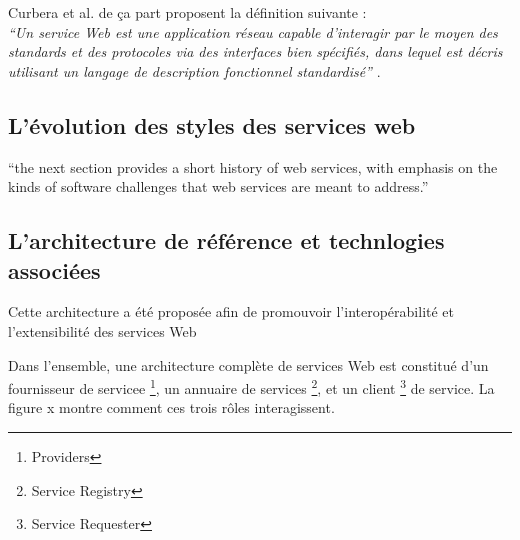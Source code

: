	 


	Curbera et al. \cite{curbera2001web} de ça part proposent la définition suivante :\\

	\emph{``Un service Web est une application réseau capable d'interagir par le moyen des standards et des protocoles 
	via des interfaces bien spécifiés, dans lequel est décris utilisant un langage de description fonctionnel
	standardisé''} .\\


    \subsection{L'évolution des styles des services web}
	``the next section provides a short history of web services, with emphasis on the kinds of software challenges
	that web services are meant to address.''

    \subsection{L'architecture de référence et technlogies associées}
	\cite{curbera2002unraveling} \cite{gottschalk2002introduction} \cite{kreger2001web} \cite{WSA}
	Cette architecture a été proposée afin de promouvoir l’interopérabilité et l’extensibilité des services Web

	Dans l'ensemble, une architecture complète de services Web est constitué d'un fournisseur de servicee
	\footnote{Providers}, un annuaire de services \footnote{Service Registry}, et un client 
	\footnote{Service Requester} de service.  La figure x montre comment ces trois rôles interagissent.\\


